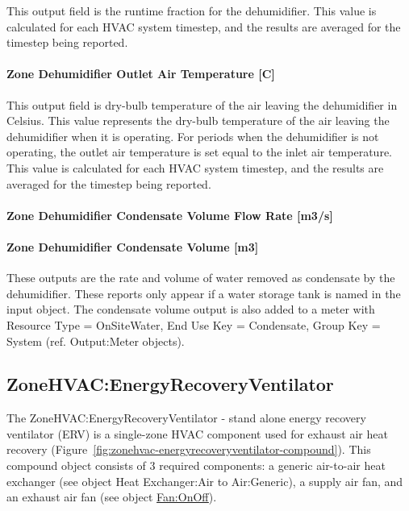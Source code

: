This output field is the runtime fraction for the dehumidifier. This value is calculated for each HVAC system timestep, and the results are averaged for the timestep being reported.

\paragraph{Zone Dehumidifier Outlet Air Temperature {[}\si{C}{]}}\label{zone-dehumidifier-outlet-air-temperature-c}

This output field is dry-bulb temperature of the air leaving the dehumidifier in Celsius. This value represents the dry-bulb temperature of the air leaving the dehumidifier when it is operating. For periods when the dehumidifier is not operating, the outlet air temperature is set equal to the inlet air temperature. This value is calculated for each HVAC system timestep, and the results are averaged for the timestep being reported.

\paragraph{Zone Dehumidifier Condensate Volume Flow Rate {[}m3/s{]}}\label{zone-dehumidifier-condensate-volume-flow-rate-m3s}

\paragraph{Zone Dehumidifier Condensate Volume {[}m3{]}}\label{zone-dehumidifier-condensate-volume-m3}

These outputs are the rate and volume of water removed as condensate by the dehumidifier. These reports only appear if a water storage tank is named in the input object. The condensate volume output is also added to a meter with Resource Type = OnSiteWater, End Use Key = Condensate, Group Key = System (ref. Output:Meter objects).

\subsection{ZoneHVAC:EnergyRecoveryVentilator}\label{zonehvacenergyrecoveryventilator}

The ZoneHVAC:EnergyRecoveryVentilator - stand alone energy recovery ventilator (ERV) is a single-zone HVAC component used for exhaust air heat recovery (Figure~\ref{fig:zonehvac-energyrecoveryventilator-compound}). This compound object consists of 3 required components: a generic air-to-air heat exchanger (see object Heat Exchanger:Air to Air:Generic), a supply air fan, and an exhaust air fan (see object \hyperref[fanonoff]{Fan:OnOff}).

